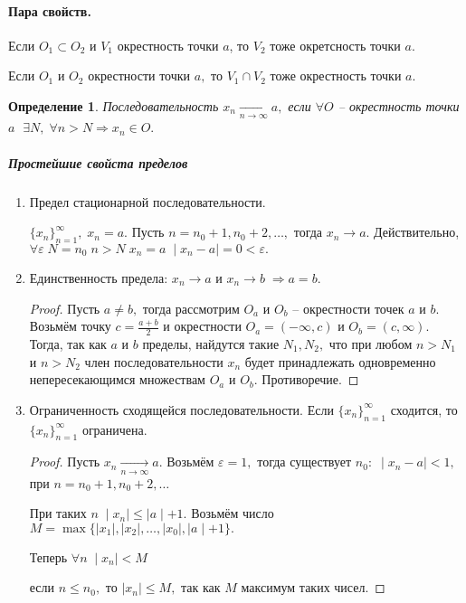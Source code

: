 \documentclass{article}
\newtheorem{Definition}{Определение}[section]
\begin{document}
\paragraph{Пара свойств.}

Если $O_1 \subset O_2$ и $V_1$ окрестность точки $a$, то $V_2$ тоже окретсность точки $a.$

Если $O_1$ и $O_2$ окрестности точки $a,$ то $V_1\cap V_2$ тоже окрестность точки $a.$

\begin{Definition}
Последовательность $x_n \xrightarrow[n\rightarrow \infty]{} a,$ если $\forall O$ -- окрестность точки $a\;$  $\exists N, \; \forall n>N \Rightarrow x_n\in O.$
\end{Definition}

\subparagraph{Простейшие свойста пределов}
\begin{enumerate}
\item Предел стационарной последовательности. 

$\{x_n\}_{n=1}^{\infty}, \; x_n=a.$ Пусть $n=n_0+1, n_0+2,\ldots,$ тогда $x_n\rightarrow a.$ Действительно, $\forall\varepsilon \; N=n_0 \; n>N \; x_n=a \; \mid x_n-a\mid=0<\varepsilon.$
\item Единственность предела:  $x_n\rightarrow a$ и $x_n\rightarrow b \; \Rightarrow a=b.$
\begin{proof}
Пусть $a\neq b,$ тогда рассмотрим $O_a$ и $O_b$ -- окрестности точек $a$ и $b.$ Возьмём точку $c=\frac{a+b}{2}$ и окрестности $O_a = (-\infty, c)$ и $O_b = (c, \infty).$ Тогда, так как $a$ и $b$ пределы, найдутся такие $N_1, N_2,$ что при любом $n>N_1$ и $n>N_2$ член последовательности $x_n$ будет принадлежать одновременно непересекающимся множествам $O_a$ и $O_b.$ Противоречие.
\end{proof}
\item Ограниченность сходящейся последовательности. Если $\{x_n\}_{n=1}^{\infty}$ сходится, то $\{x_n\}_{n=1}^{\infty}$ ограничена.
\begin{proof}
Пусть $x_n \xrightarrow[n\rightarrow\infty]{} a.$ Возьмём $\varepsilon=1,$ тогда существует $n_0: \; \mid x_n-a\mid<1,$ при $n=n_0+1, n_0+2,\ldots$

При таких $n\; \mid x_n\mid\leq\mid a\mid+1.$ Возьмём число $M=\max\{\mid x_1\mid, \mid x_2\mid,\ldots,\mid x_0\mid, \mid a\mid+1\}.$

Теперь $\forall n \; \mid x_n\mid<M$

если $n\leq n_0,$ то $\mid x_n\mid\leq M,$ так как $M$ максимум таких чисел.


\end{proof}
\end{enumerate}
\end{document}
